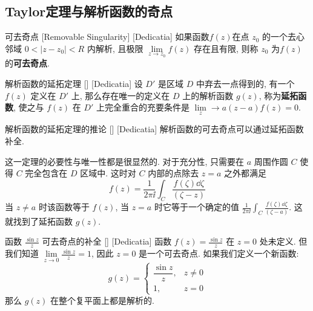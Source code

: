 \documentclass[UTF8]{ctexart}
\begin{document}
    \subsection{Taylor定理与解析函数的奇点}

        \begin{dfn}
            [RemovableSingularity]
            {可去奇点}
            [Removable Singularity]
            [Dedicatia]
            如果函数\(f(z)\)在点 \(z_0\) 的一个去心邻域 \(0 < |z - z_0| < R\) 内解析, 且极限 \(\lim\limits_{z \to z_0} f(z)\) 存在且有限, 则称 \(z_0\) 为\(f(z)\)的\textbf{可去奇点}. 
        \end{dfn}

        \begin{thm}
            [UUID]
            {解析函数的延拓定理}
            []
            [Dedicatia]
            设 \(D'\) 是区域 \(D\) 中弃去一点得到的, 有一个  \(f(z)\) 定义在 \(D'\) 上, 那么存在唯一的定义在 \(D\) 上的解析函数 \(g(z)\), 称为\textbf{延拓函数}, 使之与 \(f(z)\) 在 \(D'\) 上完全重合的充要条件是 \(\lim\limits_z\to a(z-a)f(z)=0\).
        \end{thm}

        \begin{crl}
            [UUID]
            {解析函数的延拓定理的推论}
            []
            [Dedicatia]
            解析函数的可去奇点可以通过延拓函数补全. 
        \end{crl}

        \begin{prf}
            这一定理的必要性与唯一性都是很显然的. 对于充分性, 只需要在 \(a\) 周围作圆 \(C\) 使得 \(C\) 完全包含在 \(D\) 区域中. 这时对 \(C\) 内部的点除去 \(z=a\) 之外都满足
            \[f(z)=\frac{1}{2\pi\ii}\int_C \frac{f(\zeta)\dd{\zeta}}{(\zeta-z)}\]
            当 \(z\neq a\) 时该函数等于 \(f(z)\), 当 \(z=a\) 时它等于一个确定的值 \(\frac{1}{2\pi\ii}\int_C \frac{f(\zeta)\dd{\zeta}}{(\zeta-a)}\). 这就找到了延拓函数 \(g(z)\).
        \end{prf}

        \begin{xmp}
            [UUID]
            {函数 \(\frac{\sin z}{z}\) 可去奇点的补全}
            []
            [Dedicatia]
            函数 \(f(z) = \frac{\sin z}{z}\) 在 \(z = 0\) 处未定义. 但我们知道 \(\lim\limits_{z \to 0} \frac{\sin z}{z} = 1\), 因此 \(z=0\) 是一个可去奇点. 如果我们定义一个新函数: 
            \[
            g(z) = \begin{cases}
            \dfrac{\sin z}{z}, & z \neq 0 \\
            1, & z = 0
            \end{cases}
            \]
            那么 \(g(z)\) 在整个复平面上都是解析的. 
        \end{xmp}
\end{document}
